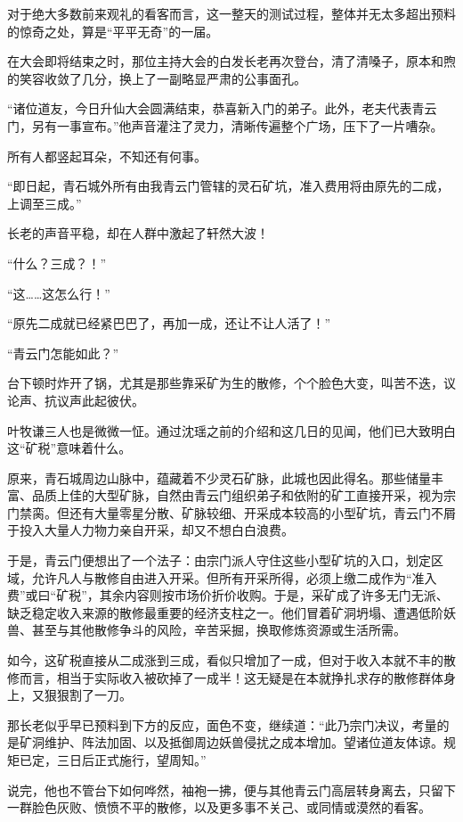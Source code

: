 对于绝大多数前来观礼的看客而言，这一整天的测试过程，整体并无太多超出预料的惊奇之处，算是“平平无奇”的一届。

\vspace{2em}

在大会即将结束之时，那位主持大会的白发长老再次登台，清了清嗓子，原本和煦的笑容收敛了几分，换上了一副略显严肃的公事面孔。

“诸位道友，今日升仙大会圆满结束，恭喜新入门的弟子。此外，老夫代表青云门，另有一事宣布。”他声音灌注了灵力，清晰传遍整个广场，压下了一片嘈杂。

所有人都竖起耳朵，不知还有何事。

“即日起，青石城外所有由我青云门管辖的灵石矿坑，准入费用将由原先的二成，上调至三成。”

长老的声音平稳，却在人群中激起了轩然大波！

“什么？三成？！”

“这……这怎么行！”

“原先二成就已经紧巴巴了，再加一成，还让不让人活了！”

“青云门怎能如此？”

台下顿时炸开了锅，尤其是那些靠采矿为生的散修，个个脸色大变，叫苦不迭，议论声、抗议声此起彼伏。

叶牧谦三人也是微微一怔。通过沈瑶之前的介绍和这几日的见闻，他们已大致明白这“矿税”意味着什么。

原来，青石城周边山脉中，蕴藏着不少灵石矿脉，此城也因此得名。那些储量丰富、品质上佳的大型矿脉，自然由青云门组织弟子和依附的矿工直接开采，视为宗门禁脔。但还有大量零星分散、矿脉较细、开采成本较高的小型矿坑，青云门不屑于投入大量人力物力亲自开采，却又不想白白浪费。

于是，青云门便想出了一个法子：由宗门派人守住这些小型矿坑的入口，划定区域，允许凡人与散修自由进入开采。但所有开采所得，必须上缴二成作为“准入费”或曰“矿税”，其余内容则按市场价折价收购。于是，采矿成了许多无门无派、缺乏稳定收入来源的散修最重要的经济支柱之一。他们冒着矿洞坍塌、遭遇低阶妖兽、甚至与其他散修争斗的风险，辛苦采掘，换取修炼资源或生活所需。

如今，这矿税直接从二成涨到三成，看似只增加了一成，但对于收入本就不丰的散修而言，相当于实际收入被砍掉了一成半！这无疑是在本就挣扎求存的散修群体身上，又狠狠割了一刀。

那长老似乎早已预料到下方的反应，面色不变，继续道：“此乃宗门决议，考量的是矿洞维护、阵法加固、以及抵御周边妖兽侵扰之成本增加。望诸位道友体谅。规矩已定，三日后正式施行，望周知。”

说完，他也不管台下如何哗然，袖袍一拂，便与其他青云门高层转身离去，只留下一群脸色灰败、愤愤不平的散修，以及更多事不关己、或同情或漠然的看客。


